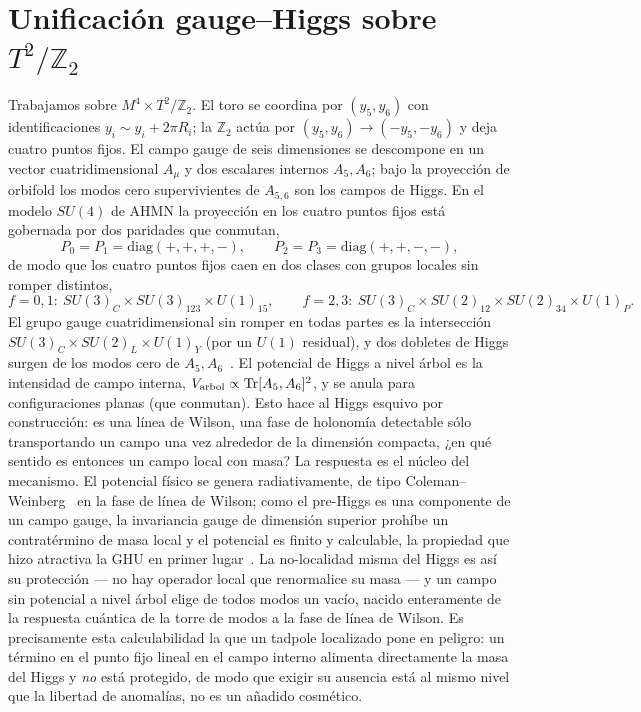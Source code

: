 \documentclass[11pt,a4paper]{article}
\newcommand{\Tr}{\mathrm{Tr}}
\begin{document}
\section{Unificaci\'on gauge--Higgs sobre \texorpdfstring{$T^2/\mathbb{Z}_2$}{T2/Z2}}\label{sec:orbifold}
Trabajamos sobre $M^4\times T^2/\mathbb{Z}_2$. El toro se coordina por $(y_5,y_6)$ con
identificaciones $y_i\sim y_i+2\pi R_i$; la $\mathbb{Z}_2$ act\'ua por
$(y_5,y_6)\to(-y_5,-y_6)$ y deja cuatro puntos fijos. El campo gauge de seis dimensiones
se descompone en un vector cuatridimensional $A_\mu$ y dos escalares internos $A_5,A_6$;
bajo la proyecci\'on de orbifold los modos cero supervivientes de $A_{5,6}$ son los
campos de Higgs. En el modelo $SU(4)$ de AHMN la proyecci\'on en los cuatro puntos fijos
est\'a gobernada por dos paridades que conmutan,
\begin{equation}
P_0=P_1=\mathrm{diag}(+,+,+,-),\qquad P_2=P_3=\mathrm{diag}(+,+,-,-),
\end{equation}
de modo que los cuatro puntos fijos caen en dos clases con grupos locales sin romper
distintos,
\begin{equation}
f=0,1:\ SU(3)_C\times SU(3)_{123}\times U(1)_{15},\qquad
f=2,3:\ SU(3)_C\times SU(2)_{12}\times SU(2)_{34}\times U(1)_P .
\end{equation}
El grupo gauge cuatridimensional sin romper en todas partes es la intersecci\'on
$SU(3)_C\times SU(2)_L\times U(1)_Y$ (por un $U(1)$ residual), y dos dobletes de Higgs
surgen de los modos cero de $A_5,A_6$~\cite{AHMN}. El potencial de Higgs a nivel \'arbol
es la intensidad de campo interna, $V_{\rm arbol}\propto \Tr[A_5,A_6]^2$, y se anula para
configuraciones planas (que conmutan). Esto hace al Higgs esquivo por construcci\'on: es
una l\'inea de Wilson, una fase de holonom\'ia detectable s\'olo transportando un campo
una vez alrededor de la dimensi\'on compacta, ¿en qu\'e sentido es entonces un campo
local con masa? La respuesta es el n\'ucleo del mecanismo. El potencial f\'isico se
genera radiativamente, de tipo Coleman--Weinberg~\cite{ColemanWeinberg} en la fase de
l\'inea de Wilson; como el pre-Higgs es una componente de un campo gauge, la invariancia
gauge de dimensi\'on superior proh\'ibe un contrat\'ermino de masa local y el potencial
es finito y calculable, la propiedad que hizo atractiva la GHU en primer
lugar~\cite{Hosotani}. La no-localidad misma del Higgs es as\'i su protecci\'on --- no
hay operador local que renormalice su masa --- y un campo sin potencial a nivel \'arbol
elige de todos modos un vac\'io, nacido enteramente de la respuesta cu\'antica de la
torre de modos a la fase de l\'inea de Wilson. Es precisamente esta calculabilidad la que
un tadpole localizado pone en peligro: un t\'ermino en el punto fijo lineal en el campo
interno alimenta directamente la masa del Higgs y \emph{no} est\'a protegido, de modo que
exigir su ausencia est\'a al mismo nivel que la libertad de anomal\'ias, no es un
a\~nadido cosm\'etico.
\end{document}
